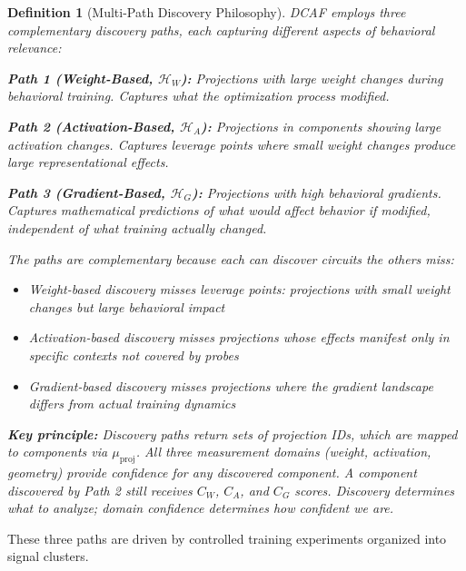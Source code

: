 \documentclass[11pt]{article}
\newtheorem{definition}{Definition}[section]
\begin{document}
\begin{definition}[Multi-Path Discovery Philosophy]
\label{def:multi-path-discovery-philosophy}
DCAF employs three complementary discovery paths, each capturing different aspects of behavioral relevance:

\textbf{Path 1 (Weight-Based, $\mathcal{H}_W$):} Projections with large weight changes during behavioral training. Captures what the optimization process modified.

\textbf{Path 2 (Activation-Based, $\mathcal{H}_A$):} Projections in components showing large activation changes. Captures leverage points where small weight changes produce large representational effects.

\textbf{Path 3 (Gradient-Based, $\mathcal{H}_G$):} Projections with high behavioral gradients. Captures mathematical predictions of what would affect behavior if modified, independent of what training actually changed.

The paths are complementary because each can discover circuits the others miss:
\begin{itemize}[nosep]
\item Weight-based discovery misses leverage points: projections with small weight changes but large behavioral impact
\item Activation-based discovery misses projections whose effects manifest only in specific contexts not covered by probes
\item Gradient-based discovery misses projections where the gradient landscape differs from actual training dynamics
\end{itemize}

\textbf{Key principle:} Discovery paths return sets of projection IDs, which are mapped to components via $\mu_{\text{proj}}$. All three measurement domains (weight, activation, geometry) provide confidence for \emph{any} discovered component. A component discovered by Path 2 still receives $C_W$, $C_A$, and $C_G$ scores. Discovery determines \emph{what} to analyze; domain confidence determines \emph{how confident} we are.
\end{definition}

These three paths are driven by controlled training experiments organized into signal clusters.
\end{document}
